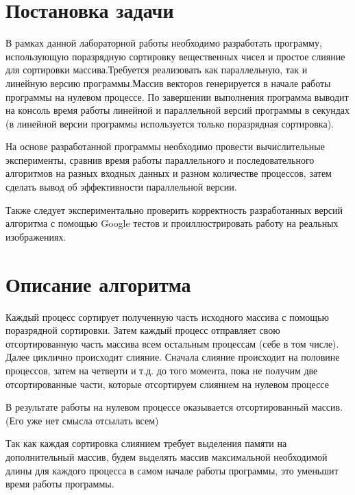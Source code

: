 \documentclass{report}
\begin{document}
\setcounter{page}{2}

\newpage

\section*{Постановка задачи}
В рамках данной лабораторной работы необходимо разработать программу, использующую поразрядную сортировку вещественных чисел и простое слияние для сортировки массива.Требуется реализовать как параллельную, так и линейную версию программы.Массив векторов генерируется в начале работы программы на нулевом процессе. По завершении выполнения программа выводит на консоль время работы линейной и параллельной версий программы в секундах (в линейной версии программы используется только поразрядная сортировка).
\par
На основе разработанной программы необходимо провести вычислительные эксперименты, сравнив время работы параллельного и последовательного алгоритмов на разных входных данных и разном количестве процессов, затем сделать вывод об эффективности параллельной версии.
\par
Также следует экспериментально проверить корректность разработанных версий алгоритма с помощью Google тестов и проиллюстрировать работу на реальных изображениях.
\newpage

\section*{Описание алгоритма}
Каждый процесс сортирует полученную часть исходного массива с помощью поразрядной сортировки. Затем каждый процесс отправляет свою отсортированную часть массива всем
остальным процессам (себе в том числе). Далее циклично происходит слияние. Сначала слияние происходит на половине процессов, затем на
четверти и т.д. до того момента, пока не получим две отсортированные
части, которые отсортируем слиянием на нулевом процессе
\par

В результате работы на нулевом процессе оказывается отсортированный
массив. (Его уже нет смысла отсылать всем)
\par

Так как каждая сортировка слиянием требует выделения памяти на
дополнительный массив, будем выделять массив максимальной необходимой
длины для каждого процесса в самом начале работы программы, это уменьшит
время работы программы.
\newpage
\end{document}
